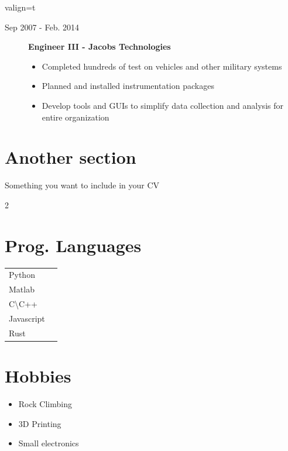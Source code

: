 \documentclass[a4paper,10pt]{article}
\begin{document}
\begin{adjustbox}{valign=t}
\begin{minipage}{0.6\textwidth}
\begin{description}
\item[\normalfont \textcolor{ColorOne}{Sep 2007 - Feb. 2014}] \textbf{Engineer III - Jacobs Technologies}
	\begin{itemize}
		\item Completed hundreds of test on vehicles and other military systems
		\item Planned and installed instrumentation packages
		\item Develop tools and GUIs to simplify data collection and analysis for entire organization
	\end{itemize}
\end{description}

\section*{Another section}
\begin{description}
	\raggedright
	\item Something you want to include in your CV
\end{description}

\MySkip

\begin{multicols}{2}
	\section*{Prog. Languages}
	\begin{tabular}{ll}
	Python  			& \SkillBull{$\bullet \bullet \bullet$}\\
	Matlab 		& \SkillBull{$\bullet \bullet \circ$}\\
	C\textbackslash C++        &\SkillBull{$\bullet \bullet \circ$}\\
	Javascript  &\SkillBull{$\bullet \circ \circ$}\\
	Rust  &\SkillBull{$\bullet \circ \circ$}\\
	\end{tabular}

	\vfill\null \columnbreak  %

	\section*{Hobbies}

	\begin{itemize}[noitemsep]
		\item Rock Climbing
		\item 3D Printing
		\item Small electronics
\end{itemize}
\end{multicols}



\end{minipage}
\end{adjustbox}
\end{document}

